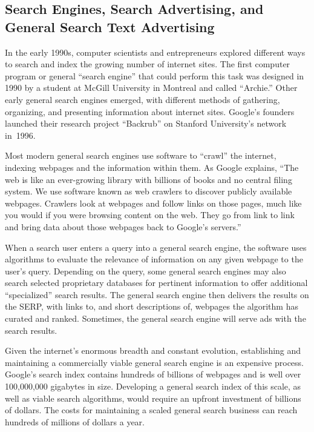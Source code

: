 \documentclass[11pt,b5paper,headings=small]{scrartcl}
\begin{document}
\subsection{Search Engines, Search Advertising, and General Search Text Advertising}


In the early 1990s, computer scientists and entrepreneurs explored different ways
to search and index the growing number of internet sites. The first computer program or general
“search engine” that could perform this task was designed in 1990 by a student at McGill
University in Montreal and called “Archie.” Other early general search engines emerged, with
different methods of gathering, organizing, and presenting information about internet sites.
Google’s founders launched their research project “Backrub” on Stanford University’s network
in~1996.


Most modern general search engines use software to “crawl” the internet,
indexing webpages and the information within them. As Google explains, “The web is like an
ever-growing library with billions of books and no central filing system. We use software known
as web crawlers to discover publicly available webpages. Crawlers look at webpages and follow
links on those pages, much like you would if you were browsing content on the web. They go
from link to link and bring data about those webpages back to Google’s servers.”


When a search user enters a query into a general search engine, the software uses
algorithms to evaluate the relevance of information on any given webpage to the user’s query.
Depending on the query, some general search engines may also search selected proprietary
databases for pertinent information to offer additional “specialized” search results. The general
search engine then delivers the results on the SERP, with links to, and short descriptions of,
webpages the algorithm has curated and ranked. Sometimes, the general search engine will serve
ads with the search results.


Given the internet’s enormous breadth and constant evolution, establishing and
maintaining a commercially viable general search engine is an expensive process. Google’s
search index contains hundreds of billions of webpages and is well over 100,000,000 gigabytes
in size. Developing a general search index of this scale, as well as viable search algorithms,
would require an upfront investment of billions of dollars. The costs for maintaining a scaled
general search business can reach hundreds of millions of dollars a year.
\end{document}
